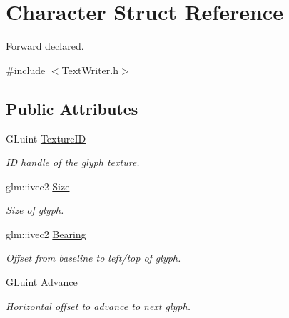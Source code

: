 \hypertarget{struct_character}{}\section{Character Struct Reference}
\label{struct_character}


Forward declared.  




{\ttfamily \#include $<$Text\+Writer.\+h$>$}

\subsection*{Public Attributes}
\begin{DoxyCompactItemize}
\item 
\mbox{\label{struct_character_a51d894cc31d79e95fe1a47fb65c6e889}} 
G\+Luint \mbox{\hyperlink{struct_character_a51d894cc31d79e95fe1a47fb65c6e889}{Texture\+ID}}
\begin{DoxyCompactList}\small\item\em ID handle of the glyph texture. \end{DoxyCompactList}\item 
\mbox{\label{struct_character_aaaa598050e0ef590fe6903fd2bab40b8}} 
glm\+::ivec2 \mbox{\hyperlink{struct_character_aaaa598050e0ef590fe6903fd2bab40b8}{Size}}
\begin{DoxyCompactList}\small\item\em Size of glyph. \end{DoxyCompactList}\item 
\mbox{\label{struct_character_afef98bf9c7f5313d96476f6f3f85f872}} 
glm\+::ivec2 \mbox{\hyperlink{struct_character_afef98bf9c7f5313d96476f6f3f85f872}{Bearing}}
\begin{DoxyCompactList}\small\item\em Offset from baseline to left/top of glyph. \end{DoxyCompactList}\item 
\mbox{\label{struct_character_ab35bae8be6740729fc5839c237a659f6}} 
G\+Luint \mbox{\hyperlink{struct_character_ab35bae8be6740729fc5839c237a659f6}{Advance}}
\begin{DoxyCompactList}\small\item\em Horizontal offset to advance to next glyph. \end{DoxyCompactList}\end{DoxyCompactItemize}


